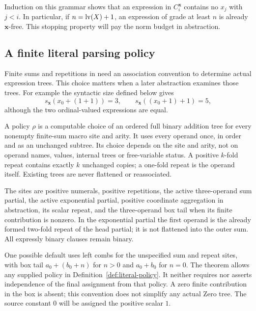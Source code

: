 Induction on this grammar shows that an expression in
$C_i^{\mathbf x}$ contains no $x_j$ with $j<i$.
In particular, if $n=\operatorname{lv}(X)+1$, an expression of grade at least
$n$ is already $\mathbf x$-free.  This stopping property will pay
the norm budget in abstraction.

\subsection{A finite literal parsing policy}

Finite sums and repetitions in \cite[Definitions~2.10 and 2.18]{ww}
need an association convention to determine actual expression trees.
This choice matters when a later abstraction examines those trees.
For example the syntactic size defined below gives
\[
 s_{\mathbf x}(x_0+(1+1))=3,\qquad
 s_{\mathbf x}((x_0+1)+1)=5,
\]
although the two ordinal-valued expressions are equal.

\begin{definition}\label{def:literal-policy}
A policy $\rho$ is a computable choice of an ordered full binary
addition tree for every nonempty finite-sum macro site and arity.
It uses every operand once, in order and as an unchanged subtree.
Its choice depends on the site and arity, not on operand names,
values, internal trees or free-variable status.  A positive $k$-fold
repeat contains exactly $k$ unchanged copies; a one-fold repeat is
the operand itself.  Existing trees are never flattened or reassociated.
\end{definition}

The sites are positive numerals, positive repetitions, the active
three-operand sum partial, the active exponential partial, positive
coordinate aggregation in abstraction, its scalar repeat, and the
three-operand box tail when its finite contribution is nonzero.
In the exponential partial the first operand is the already formed
two-fold repeat of the head partial; it is not flattened into the
outer sum.  All expressly binary clauses remain binary.

One possible default uses left combs for the unspecified sum and repeat
sites, with box tail $a_0+(b_0+n)$ for $n>0$ and $a_0+b_0$ for
$n=0$.  The theorem allows any supplied policy in Definition~\ref{def:literal-policy}.
It neither requires nor asserts independence of the final assignment
from that policy.  A zero finite contribution in the box is absent;
this convention does not simplify any actual Zero tree.  The source
constant $0$ will be assigned the positive scalar $1$.

